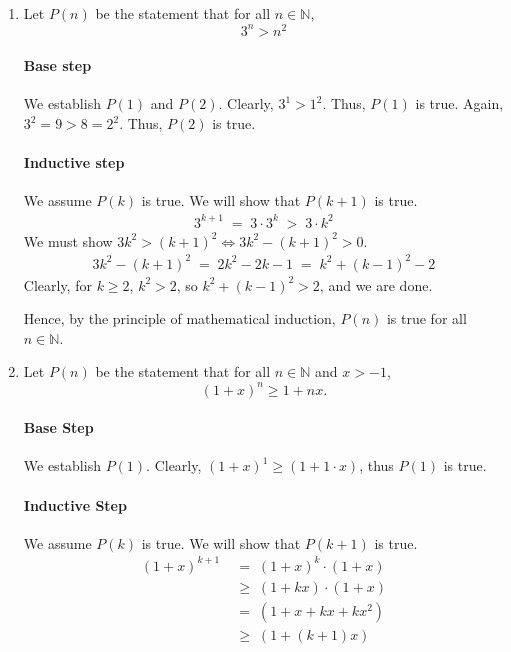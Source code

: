 \documentclass[10pt]{article}
\begin{document}
        \begin{enumerate}
                \item Let $P(n)$ be the statement that for all $n \in \mathbb{N}$,
                \[3^n > n^2\]
                \paragraph{Base step}
                We establish $P(1)$ and $P(2)$. Clearly, $3^1 > 1^2$. Thus, $P(1)$ is true.
                Again, $3^2 = 9 > 8 = 2^2$. Thus, $P(2)$ is true.
                \paragraph{Inductive step}
                We assume $P(k)$ is true. We will show that $P(k + 1)$ is true.
                \begin{align*}
                        3^{k + 1} \;=\; 3\cdot 3^k
                                \;>\; 3\cdot k^2
                \end{align*}
                We must show $3k^2 > (k + 1)^2 \Leftrightarrow 3k^2 - (k + 1)^2 > 0$.
                \begin{align*}
                        3k^2 - (k + 1)^2 \;=\; 2k^2 - 2k - 1
                                \;=\; k^2 + (k - 1)^2  - 2
                \end{align*}
                Clearly, for $k \geq 2$, $k^2 > 2$, so $k^2 + (k - 1)^2 > 2$, and we are done.

                Hence, by the principle of mathematical induction, $P(n)$ is true for all $n \in \mathbb{N}$.

                \item Let $P(n)$ be the statement that for all $n \in \mathbb{N}$ and $x > -1$,
                \[(1 + x)^n \geq 1 + nx. \tag{Bernoulli's Inequality}\]
                \paragraph{Base Step}
                We establish $P(1)$. 
                Clearly, $(1 + x)^1 \geq (1 + 1\cdot x)$, thus $P(1)$ is true.
                \paragraph{Inductive Step}
                We assume $P(k)$ is true. We will show that $P(k + 1)$ is true.
                \begin{align*}
                        (1 + x)^{k + 1} \;&=\; (1 + x)^k\cdot (1 + x) \\
                                \;&\geq\; (1 + kx)\cdot (1 + x) \tag{$x + 1 > 0$}\\
                                \;&=\; (1 + x + kx + kx^2)\\
                                \;&\geq\; (1 + (k + 1)x) \tag{$k > 0$ and $x^2 \geq 0$}
                \end{align*}
                

\end{enumerate}
\end{document}
